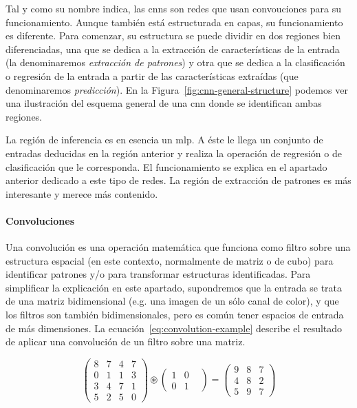 Tal y como su nombre indica, las \acp{cnn} son redes que usan convouciones para su funcionamiento. Aunque también está estructurada en capas, su funcionamiento es diferente. Para comenzar, su estructura se puede dividir en dos regiones bien diferenciadas, una que se dedica a la extracción de características de la entrada (la denominaremos \textit{extracción de patrones}) y otra que se dedica a la clasificación o regresión de la entrada a partir de las características extraídas (que denominaremos \textit{predicción}). En la Figura~\ref{fig:cnn-general-structure} podemos ver una ilustración del esquema general de una \acl{cnn} donde se identifican ambas regiones.

La región de inferencia es en esencia un \ac{mlp}. A éste le llega un conjunto de entradas deducidas en la región anterior y realiza la operación de regresión o de clasificación que le corresponda. El funcionamiento se explica en el apartado anterior dedicado a este tipo de redes. La región de extracción de patrones es más interesante y merece más contenido.

\paragraph{Convoluciones}

Una convolución es una operación matemática que funciona como filtro sobre una estructura espacial (en este contexto, normalmente de matriz o de cubo) para identificar patrones y/o para transformar estructuras identificadas. Para simplificar la explicación en este apartado, supondremos que la entrada se trata de una matriz bidimensional (e.g. una imagen de un sólo canal de color), y que los filtros son también bidimensionales, pero es común tener espacios de entrada de más dimensiones. La ecuación~\ref{eq:convolution-example} describe el resultado de aplicar una convolución de un filtro sobre una matriz.

\begin{equation*}
	\begin{pmatrix}
		8 & 7 & 4 & 7  \\
		0 & 1 & 1 & 3  \\
		3 & 4 & 7 & 1  \\
		5 & 2 & 5 & 0
	\end{pmatrix}
	\circledast
	\begin{pmatrix}
		1 & 0 &  \\
		0 & 1
	\end{pmatrix}
	=
	\begin{pmatrix}
		9 & 8 & 7  \\
		4 & 8 & 2  \\
		5 & 9 & 7
	\end{pmatrix}
	\label{eq:convolution-example}
\end{equation*}

